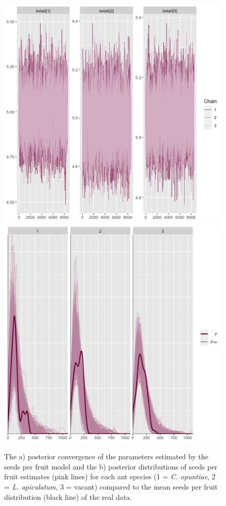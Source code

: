 \documentclass[11pt]{article}
\begin{document}
 \begin{figure}
 	\includegraphics[width = 0.45\linewidth]{Figures/seed_conv.png}
 	\includegraphics[width=0.45\linewidth]{Figures/seed_ant_post.png}
 	\caption{The a) posterior convergence of the parameters estimated by the seeds per fruit model and the b) posterior distributions of seeds per fruit estimates (pink lines) for each ant species (1 = \textit{C. opuntiae}, 2 = \textit{L. apiculatum}, 3 = vacant) compared to the mean seeds per fruit distribution (black line) of the real data.}
 	\label{fig:seed_post}
 \end{figure}
\end{document}
